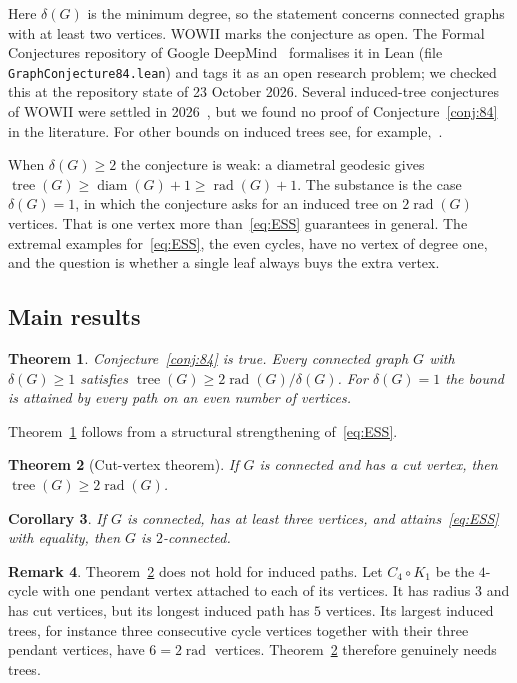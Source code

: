 \documentclass[11pt,a4paper]{article}
\newtheorem{theorem}{Theorem}[section]
\newtheorem{corollary}[theorem]{Corollary}
\theoremstyle{definition}
\newtheorem{remark}[theorem]{Remark}
\newcommand{\rad}{\operatorname{rad}}
\newcommand{\diam}{\operatorname{diam}}
\newcommand{\tr}{\operatorname{tree}}
\begin{document}
Here $\delta(G)$ is the minimum degree, so the statement concerns connected graphs with at least two vertices. WOWII marks the conjecture as open. The Formal Conjectures repository of Google DeepMind~\cite{FC} formalises it in Lean (file \texttt{GraphConjecture84.lean}) and tags it as an open research problem; we checked this at the repository state of 23 October 2026. Several induced-tree conjectures of WOWII were settled in 2026~\cite{Fer26,Mak}, but we found no proof of Conjecture~\ref{conj:84} in the literature. For other bounds on induced trees see, for example,~\cite{FLS09}.

When $\delta(G)\ge2$ the conjecture is weak: a diametral geodesic gives $\tr(G)\ge\diam(G)+1\ge\rad(G)+1$. The substance is the case $\delta(G)=1$, in which the conjecture asks for an induced tree on $2\rad(G)$ vertices. That is one vertex more than~\eqref{eq:ESS} guarantees in general. The extremal examples for~\eqref{eq:ESS}, the even cycles, have no vertex of degree one, and the question is whether a single leaf always buys the extra vertex.

\subsection{Main results}

\begin{theorem}\label{thm:84}
Conjecture~\ref{conj:84} is true. Every connected graph $G$ with $\delta(G)\ge1$ satisfies $\tr(G)\ge 2\rad(G)/\delta(G)$. For $\delta(G)=1$ the bound is attained by every path on an even number of vertices.
\end{theorem}

Theorem~\ref{thm:84} follows from a structural strengthening of~\eqref{eq:ESS}.

\begin{theorem}[Cut-vertex theorem]\label{thm:cut}
If $G$ is connected and has a cut vertex, then $\tr(G)\ge 2\rad(G)$.
\end{theorem}

\begin{corollary}\label{cor:2conn}
If $G$ is connected, has at least three vertices, and attains~\eqref{eq:ESS} with equality, then $G$ is $2$-connected.
\end{corollary}

\begin{remark}\label{rem:nopath}
Theorem~\ref{thm:cut} does not hold for induced paths. Let $C_4\circ K_1$ be the $4$-cycle with one pendant vertex attached to each of its vertices. It has radius $3$ and has cut vertices, but its longest induced path has $5$ vertices. Its largest induced trees, for instance three consecutive cycle vertices together with their three pendant vertices, have $6=2\rad$ vertices. Theorem~\ref{thm:cut} therefore genuinely needs trees.
\end{remark}
\end{document}

